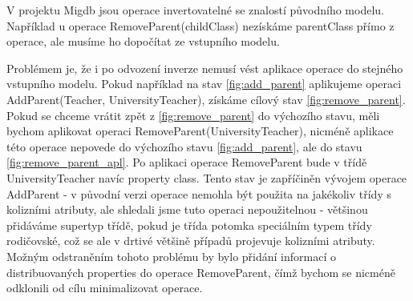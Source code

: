 \documentclass[11pt,twoside,a4paper]{book}
\begin{document}
V projektu Migdb jsou operace invertovatelné se znalostí původního modelu.
Například u operace RemoveParent(childClass) nezískáme parentClass přímo z
operace, ale musíme ho dopočítat ze vstupního modelu.

Problémem je, že i po odvození inverze nemusí vést aplikace operace do stejného
vstupního modelu. Pokud například na stav \ref{fig:add_parent} aplikujeme
operaci AddParent(Teacher, UniversityTeacher), získáme cílový stav
\ref{fig:remove_parent}. Pokud se chceme vrátit zpět z \ref{fig:remove_parent}
do výchozího stavu, měli bychom aplikovat operaci
RemoveParent(UniversityTeacher), nicméně aplikace této operace nepovede do
výchozího stavu \ref{fig:add_parent}, ale do stavu \ref{fig:remove_parent_apl}.
Po aplikaci operace RemoveParent bude v třídě UniversityTeacher navíc property
class. Tento stav je zapříčiněn vývojem operace AddParent - v původní verzi
operace nemohla být použita na jakékoliv třídy s kolizními atributy, ale
shledali jsme tuto operaci nepoužitelnou - většinou přidáváme supertyp třídě,
pokud je třída potomka speciálním typem třídy rodičovské, což se ale v
drtivé většině případů projevuje kolizními atributy. Možným odstraněním tohoto
problému by bylo přidání informací o distribuovaných properties do operace
RemoveParent, čímž bychom se nicméně odklonili od cílu minimalizovat operace.
\end{document}
